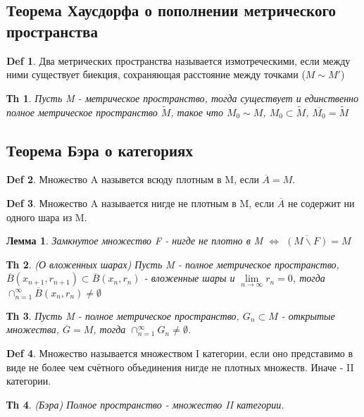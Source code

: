 \documentclass[14pt]{article}
\theoremstyle{plain}
\newtheorem{Thm}{Тh}
\newtheorem{Lem}{Лемма}
\theoremstyle{definition}
\newtheorem{Def}{Def}
\begin{document}
			\subsection{Теорема Хаусдорфа о пополнении метрического пространства}
				\begin{Def}
					Два метрических пространства называется измотреческими, если между ними существует биекция, сохраняющая расстояние между точками ($M \sim M'$)	
				\end{Def}
				\begin{Thm}
					Пусть M - метрическое пространство, тогда существует и единственно полное метрическое пространство $\widetilde{M}$, такое что $M_0 \sim M$, $M_0 \subset \widetilde{M}$, $\overline{M_0} = \widetilde{M}$
				\end{Thm}
			\subsection{Теорема Бэра о категориях}
				\begin{Def}
					Множество A назывется всюду плотным в M, если $\overline{A} = M$.
				\end{Def}
				\begin{Def}
					Множество A называется нигде не плотным в M, если $\overline{A}$ не содержит ни одного шара из M. 
				\end{Def}
				\begin{Lem}
					Замкнутое множество F - нигде не плотно в M $\Leftrightarrow$ $ \overline{(M \backslash F)} = M$
				\end{Lem}
				\begin{Thm}
					(О вложенных шарах)\newline
					Пусть M - полное метрическое пространство, $\overline{B}(x_{n+1}, r_{n+1}) \subset \overline{B}(x_n, r_n)$ - вложенные шары и $\lim\limits_{n\to\infty} r_n = 0$, тогда $\cap_{n=1}^{\infty} \overline{B}(x_n, r_n) \neq \emptyset$
				\end{Thm}
				\begin{Thm}
					Пусть M - полное метрическое пространство, $G_n \subset M$ - открытые множества, $\overline{G} = M$, тогда $\cap_{n=1}^{\infty} G_n \neq \emptyset$. 
				\end{Thm}
				\begin{Def}
					Множество называется множеством I категории, если оно представимо в виде не более чем счётного объединения нигде не плотных множеств. Иначе - II категории.
				\end{Def}
				\begin{Thm}
					(Бэра)\newline
					Полное пространство - множество II категории.
				\end{Thm}
\end{document}
